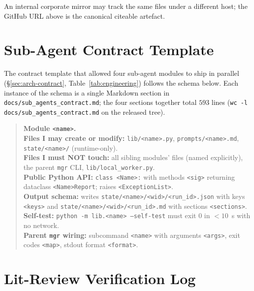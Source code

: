 \noindent An internal corporate mirror may track the same files under a
different host; the GitHub URL above is the canonical citeable artefact.

\section{Sub-Agent Contract Template}
\label{app:contract-template}

The contract template that allowed four sub-agent modules to ship in
parallel (\S\ref{sec:arch-contract}, Table~\ref{tab:engineering})
follows the schema below. Each instance of the schema is a single
Markdown section in \texttt{docs/sub\_agents\_contract.md}; the four
sections together total \(593\) lines (\texttt{wc -l docs/sub\_agents\_contract.md} on the released tree).

\begin{quote}\small
\noindent\textbf{Module \texttt{<name>}.} \\
\textbf{Files I may create or modify:} \texttt{lib/<name>.py},
  \texttt{prompts/<name>.md}, \texttt{state/<name>/} (runtime-only). \\
\textbf{Files I must NOT touch:} all sibling modules' files (named
  explicitly), the parent \texttt{mgr} CLI, \texttt{lib/local\_worker.py}. \\
\textbf{Public Python API:} \texttt{class <Name>:} with methods
  \texttt{<sig>} returning dataclass \texttt{<Name>Report}; raises
  \texttt{<ExceptionList>}. \\
\textbf{Output schema:} writes
  \texttt{state/<name>/<wid>/<run\_id>.json} with keys
  \texttt{<keys>} and \texttt{state/<name>/<wid>/<run\_id>.md} with
  sections \texttt{<sections>}. \\
\textbf{Self-test:} \texttt{python -m lib.<name> --self-test} must
  exit 0 in \(<10\)~s with no network. \\
\textbf{Parent \texttt{mgr} wiring:} subcommand \texttt{<name>}
  with arguments \texttt{<args>}, exit codes \texttt{<map>}, stdout
  format \texttt{<format>}.
\end{quote}

\section{Lit-Review Verification Log}
\label{app:litreview-table}

